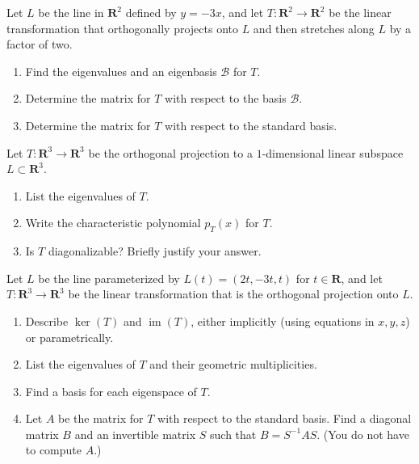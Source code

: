 \documentclass[11pt,twoside,openany]{memoir}
\begin{document}
        \begin{exercise}
        Let $L$ be the line in $\mathbf{R}^2$ defined by $y=-3x$, and let $T:\mathbf{R}^2\to \mathbf{R}^2$ be the linear transformation that orthogonally projects onto $L$ and then stretches along $L$ by a factor of two.
        \begin{enumerate}[label = (\arabic*)]
            \item Find the eigenvalues and an eigenbasis $\mathcal{B}$ for $T$.
            \item Determine the matrix for $T$ with respect to the basis $\mathcal{B}$.
            \item Determine the matrix for $T$ with respect to the standard basis.
        \end{enumerate}
        \end{exercise}
        
        \newpage
        \begin{exercise}
        Let $T:\mathbf{R}^3\to \mathbf{R}^3$ be the orthogonal projection to a $1$-dimensional linear subspace $L\subset \mathbf{R}^3$.
        \begin{enumerate}[label = (\arabic*)]
            \item List the eigenvalues of $T$.
            \item Write the characteristic polynomial $p_T(x)$ for $T$.
            \item Is $T$ diagonalizable? Briefly justify your answer.
        \end{enumerate}
        \end{exercise}
        
        \begin{exercise}
        Let $L$ be the line parameterized by $L(t)=(2t,-3t,t)$ for $t\in \mathbf{R}$, and let $T:\mathbf{R}^3\to \mathbf{R}^3$ be the linear transformation that is the orthogonal projection onto $L$.
        \begin{enumerate}[label = (\arabic*)]
            \item Describe $\operatorname{ker}(T)$ and $\operatorname{im}(T)$, either implicitly (using equations in $x,y,z$) or parametrically.
            \item List the eigenvalues of $T$ and their geometric multiplicities.
            \item Find a basis for each eigenspace of $T$.
            \item Let $A$ be the matrix for $T$ with respect to the standard basis. Find a diagonal matrix $B$ and an invertible matrix $S$ such that $B=S^{-1}AS$. (You do not have to compute $A$.)
        \end{enumerate}
        \end{exercise}
        
\end{document}
